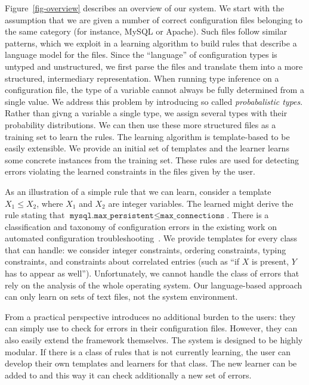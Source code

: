 Figure~\ref{fig-overview} describes an overview of our system. We start
with the assumption that we are given a number of correct configuration
files belonging to the same category (for instance, MySQL or
Apache). Such files follow similar patterns, which we exploit
in a learning algorithm to build rules that
describe a language model for the files. Since the
``language'' of configuration types is untyped and unstructured, we
first parse the files and translate them into a more structured,
intermediary representation.
When running type inference on a configuration file, the type of a variable cannot always be fully determined from a single value.
We address this problem by introducing so called {\emph{probabalistic types}}.
Rather than givng a variable a single type, we assign several types with their probability distributions. 
We can then use these more structured files
as a training set to learn the rules. The learning algorithm
is template-based to be easily extensible. We provide an initial set of templates and the
learner learns some concrete instances from the training set. These
rules are used for detecting errors violating the learned constraints
in the files given by the user.

As an 
illustration of a simple rule that we can learn, consider a template
 $X_1 \le X_2$, where $X_1$ and $X_2$ are
integer variables. The learned might derive the rule stating that
$\texttt{mysql.max\_persistent} \le \texttt{max\_connections}$. There is a classification and taxonomy of configuration errors in the 
existing work on automated configuration troubleshooting~\cite{yin11anempirical, configdataset}. We provide templates for every class that \app can handle: we consider integer constraints, ordering
constraints, typing constraints, and constraints about correlated entries (such as ``if $X$ is present, $Y$ has to appear as well''). 
Unfortunately, we cannot handle the class of errors that rely on the analysis of the whole operating system.
Our language-based approach can only learn on sets of text files, not the system environment.

From a practical perspective \app introduces no additional burden 
to the users: they can simply use \app to check for errors in their configuration files. However, they can also easily extend the framework themselves. The system is designed to be highly modular. If there is a class of rules that \app is not currently learning, the user can develop their own templates and learners for that class. The new learner can be added to \app and this way it can check additionally a new set of errors.


